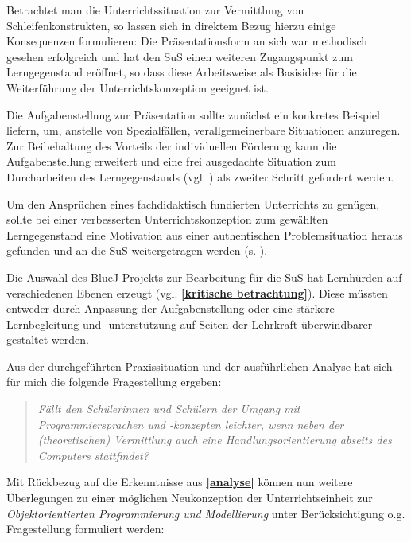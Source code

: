 \documentclass[paper=a4, DIV=13, BCOR=8mm, oneside=on, onecolumn=on, open = any, titlepage =on, parskip =half-, headsepline = on, footsepline = off, chapterprefix = on, sectionprefix = on, appendixprefix = off, fontsize = 12pt, numbers = noenddot, abstract = off]{scrreprt}
\begin{document}
Betrachtet man die Unterrichtssituation zur Vermittlung von Schleifenkonstrukten, so lassen sich in direktem Bezug hierzu einige Konsequenzen formulieren:
Die Präsentationsform an sich war methodisch gesehen erfolgreich und hat den SuS einen weiteren Zugangspunkt zum Lerngegenstand eröffnet, so dass diese Arbeitsweise als Basisidee für die Weiterführung der Unterrichtskonzeption geeignet ist.

Die Aufgabenstellung zur Präsentation sollte zunächst ein konkretes Beispiel liefern, um, anstelle von Spezialfällen, verallgemeinerbare Situationen anzuregen. Zur Beibehaltung des Vorteils der individuellen Förderung kann die Aufgabenstellung erweitert und eine frei ausgedachte Situation zum Durcharbeiten des Lerngegenstands (vgl. \cite{aebli:11}) als zweiter Schritt gefordert werden.

Um den Ansprüchen eines fachdidaktisch fundierten Unterrichts zu genügen, sollte bei einer verbesserten Unterrichtskonzeption zum gewählten Lerngegenstand eine Motivation aus einer authentischen Problemsituation heraus gefunden und an die SuS weitergetragen werden (s. \cite[S.68]{hubwieser:07}).

Die Auswahl des BlueJ-Projekts zur Bearbeitung für die SuS hat Lernhürden auf verschiedenen Ebenen erzeugt (vgl. \textbf{\ref{kritische betrachtung}}). Diese müssten entweder durch Anpassung der Aufgabenstellung oder eine stärkere Lernbegleitung und -unterstützung auf Seiten der Lehrkraft überwindbarer gestaltet werden. 


Aus der durchgeführten Praxissituation und der ausführlichen Analyse hat sich für mich die folgende Fragestellung ergeben:
\begin{quote}
\emph{Fällt den Schülerinnen und Schülern der Umgang mit Programmiersprachen und -konzepten leichter, wenn neben der (theoretischen) Vermittlung auch eine Handlungsorientierung abseits des Computers stattfindet?}
\end{quote}

Mit Rückbezug auf die Erkenntnisse aus \textbf{\ref{analyse}} können nun weitere Überlegungen zu einer möglichen  Neukonzeption der Unterrichtseinheit zur \emph{Objektorientierten Programmierung und Modellierung} unter Berücksichtigung o.g. Fragestellung formuliert werden:
\end{document}
